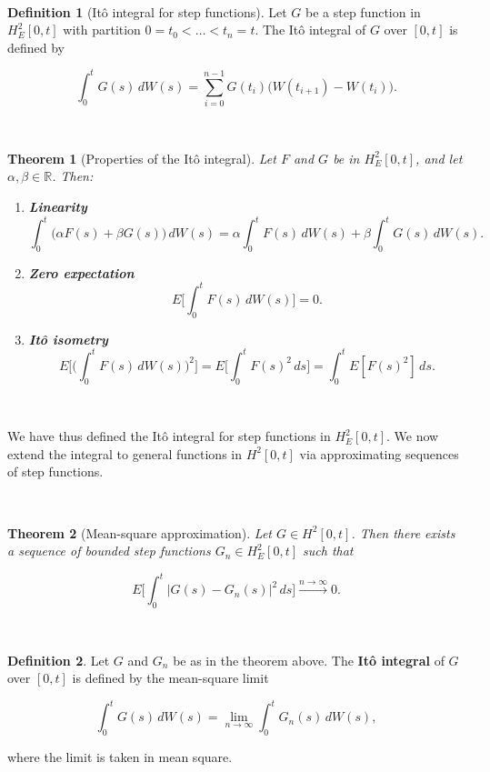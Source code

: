 \documentclass[
  11pt,
  a4paper,
]{book}
\newtheorem{theorem}{Theorem}[chapter]
\theoremstyle{definition}
\newtheorem{definition}{Definition}[chapter]
\theoremstyle{definition}
\theoremstyle{definition}
\theoremstyle{definition}
\theoremstyle{remark}
\begin{document}
\(\,\)

\begin{definition}[Itô integral for step functions]
Let \(G\) be a step function in \(H_E^2[0,t]\) with partition \(0=t_0<\dots<t_n=t\). The Itô integral of \(G\) over \([0,t]\) is defined by

\[
\int_0^t G(s)\,dW(s) = \sum_{i=0}^{n-1} G(t_i)\big(W(t_{i+1})-W(t_i)\big).
\]
\end{definition}

\(\,\)

\begin{theorem}[Properties of the Itô integral]

Let \(F\) and \(G\) be in \(H_E^2[0,t]\), and let \(\alpha,\beta\in\mathbb{R}\). Then:

\begin{enumerate}
\def\labelenumi{\arabic{enumi}.}
\item
  \textbf{Linearity}
  \[
  \int_0^t \big(\alpha F(s) + \beta G(s)\big)\,dW(s)
  = \alpha\int_0^t F(s)\,dW(s) + \beta\int_0^t G(s)\,dW(s).
  \]
\item
  \textbf{Zero expectation}
  \[
  E\Big[\int_0^t F(s)\,dW(s)\Big] = 0.
  \]
\item
  \textbf{Itô isometry}
  \[
  E\Big[\big(\int_0^t F(s)\,dW(s)\big)^2\Big] = E\Big[\int_0^t F(s)^2\,ds\Big] = \int_0^t E[F(s)^2]\,ds.
  \]
\end{enumerate}

\end{theorem}

\(\,\)

We have thus defined the Itô integral for step functions in \(H_E^2[0,t]\). We now extend the integral to general functions in \(H^2[0,t]\) via approximating sequences of step functions.

\(\,\)

\begin{theorem}[Mean-square approximation]
Let \(G\in H^2[0,t]\). Then there exists a sequence of bounded step functions \(G_n\in H_E^2[0,t]\) such that

\[
E\Big[\int_0^t |G(s)-G_n(s)|^2\,ds\Big] \xrightarrow{n\to\infty} 0.
\]
\end{theorem}

\(\,\)

\begin{definition}
Let \(G\) and \(G_n\) be as in the theorem above. The \textbf{Itô integral} of \(G\) over \([0,t]\) is defined by the mean-square limit

\[
\int_0^t G(s)\,dW(s) = \lim_{n\to\infty} \int_0^t G_n(s)\,dW(s),
\]

where the limit is taken in mean square.
\end{definition}
\end{document}
